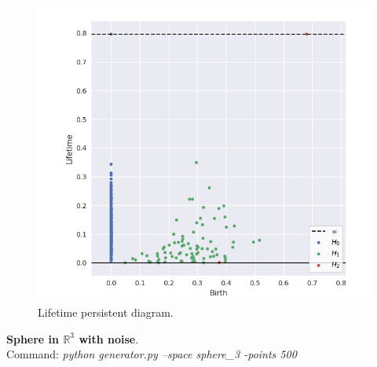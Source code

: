 \documentclass[11pt,a4paper]{report}
\begin{document}
              \begin{figure}[H]
                \centering
                \includegraphics[width=0.5\linewidth, scale=0.5]{./ripser/on_sphere_lifetime.PNG}
                \caption{Lifetime persistent diagram.}
                \label{fig:sep hom}
              \end{figure}
              \textbf{Sphere in $\mathbb{R}^3$ with noise}.\\
              Command: \textit{python generator.py --space sphere\_3 -points 500}
\end{document}
